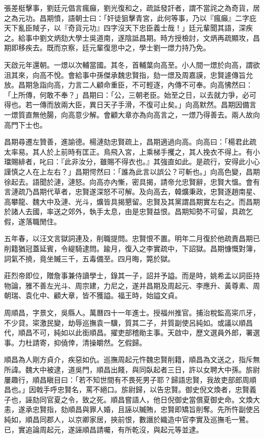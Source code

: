 \begin{pinyinscope}
張差梃擊事，劉廷元倡言瘋癲，劉光復和之，疏詆發訐者，謂不當詫之為奇貨，居之為元功。昌期憤，語朝士曰：「奸徒狙擊青宮，此何等事，乃以『瘋癲』二字庇天下亂臣賊子，以『奇貨元功』四字沒天下忠臣義士哉！」廷元輩聞其語，深疾之。給事中劉文炳劾大學士吳道南，遂陰詆昌期。時方授檢討，文炳再疏顯攻，昌期即移疾去。既而京察，廷元輩復思中之，學士劉一燝力持乃免。

天啟元年還朝。一燝以次輔當國。其冬，首輔葉向高至。小人間一燝於向高，謂欲沮其來，向高不悅。會給事中孫傑承魏忠賢指，劾一燝及周嘉謨，忠賢遽傳旨允放。昌期急詣向高，力言二人顧命重臣，不可輕逐，內傳不可奉。向高怫然曰：「上所傳，何敢不奉？」昌期曰：「公，三朝老臣。始至之日，以去就力爭，必可得也。若一傳而放兩大臣，異日天子手滑，不復可止矣。」向高默然。昌期因備言一燝質直無他腸，向高意少解。會顧大章亦為向高言之，一燝乃得善去。兩人故向高門下士也。

昌期尋遷左贊善，進諭德。楊漣劾忠賢疏上，昌期適過向高。向高曰：「楊君此疏太率易。其人於上前時有匡正。鳥飛入宮，上乘梯手攫之，其人挽衣不得上。有小璫賜緋者，叱曰：『此非汝分，雖賜不得衣也。』其強直如此。是疏行，安得此小心謹慎之人在上左右？」昌期愕然曰：「誰為此言以誤公？可斬也。」向高色變，昌期徐起去。語聞於漣，漣怒。向高亦內慚，密具揭，請帝允忠賢辭，忠賢大慍。會有言漣疏乃昌期代草者，忠賢遂深怒不可解。及向高去，韓爌秉政，忠賢逐趙南星、高攀龍、魏大中及漣、光斗，爌皆具揭懇留。忠賢及其黨謂昌期實左右之。而昌期於諸人去國，率送之郊外，執手太息，由是忠賢益恨。昌期知勢不可留，具疏乞假，遂落職閒住。

五年春，以汪文言獄詞連及，削職提問。忠賢恨不置。明年二月復於他疏責昌期已削籍猶冠蓋延賓，令緹騎逮問。踰月，復入之李實疏中，下詔獄。昌期慷慨對簿，詞氣不撓，竟坐贓三千，五毒備至。四月晦，斃於獄。

莊烈帝即位，贈詹事兼侍讀學士，錄其一子，詔并予謚。而是時，姚希孟以詞臣持物論，雅不善左光斗、周宗建，力尼之，遂并昌期及周起元、李應升、黃尊素、周朝瑞、袁化中、顧大章，皆不獲謚。福王時，始謚文貞。

周順昌，字景文，吳縣人。萬曆四十一年進士。授福州推官。捕治稅監高寀爪牙，不少貸。寀激民變，劫辱巡撫袁一驥，質其二子，并質副使呂純如。或議以順昌代，順昌不可，純如以此銜順昌。擢吏部稽勛主事。天啟中，歷文選員外郎，署選事。力杜請寄，抑僥倖，清操皭然。乞假歸。

順昌為人剛方貞介，疾惡如仇。巡撫周起元忤魏忠賢削籍，順昌為文送之，指斥無所諱。魏大中被逮，道吳門，順昌出餞，與同臥起者三日，許以女聘大中孫。旂尉屢趣行，順昌瞋目曰：「若不知世間有不畏死男子耶？歸語忠賢，我故吏部郎周順昌也。」因戟手呼忠賢名，罵不絕口。旂尉歸，以告忠賢。御史倪文煥者，忠賢義子也，誣劾同官夏之令，致之死。順昌嘗語人，他日倪御史當償夏御史命。文煥大恚，遂承忠賢指，劾順昌與罪人婚，且誣以贓賄，忠賢即矯旨削奪。先所忤副使呂純如，順昌同郡人，以京卿家居，挾前恨，數譖於織造中官李實及巡撫毛一鷺。已，實追論周起元，遂誣順昌請囑，有所乾沒，與起元等並逮。


\end{pinyinscope}
